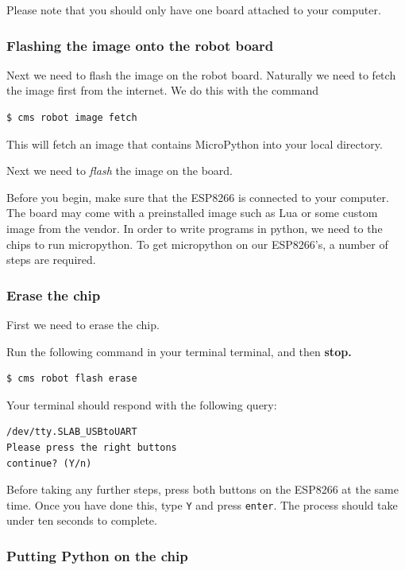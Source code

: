 Please note that you should only have one board attached to your
computer.

\subsubsection{Flashing the image onto the robot
board}\label{flashing-the-image-onto-the-robot-board}

Next we need to flash the image on the robot board. Naturally we need to
fetch the image first from the internet. We do this with the command

\begin{verbatim}
$ cms robot image fetch
\end{verbatim}

This will fetch an image that contains MicroPython into your local
directory.

Next we need to \emph{flash} the image on the board.

Before you begin, make sure that the ESP8266 is connected to your
computer. The board may come with a preinstalled image such as Lua or
some custom image from the vendor. In order to write programs in python,
we need to the chips to run micropython. To get micropython on our
ESP8266's, a number of steps are required.

\subsubsection{Erase the chip}\label{erase-the-chip}

First we need to erase the chip.

Run the following command in your terminal terminal, and then
\textbf{stop.}

\begin{verbatim}
$ cms robot flash erase
\end{verbatim}

Your terminal should respond with the following query:

\begin{verbatim}
/dev/tty.SLAB_USBtoUART
Please press the right buttons
continue? (Y/n)
\end{verbatim}

Before taking any further steps, press both buttons on the ESP8266 at
the same time. Once you have done this, type \texttt{Y} and press
\texttt{enter}. The process should take under ten seconds to complete.

\subsubsection{Putting Python on the
chip}\label{putting-python-on-the-chip}

